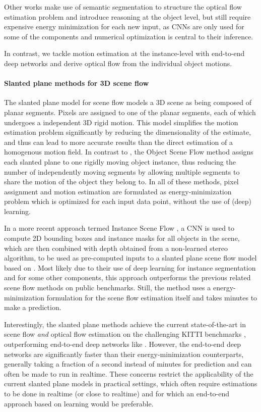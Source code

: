 Other works \cite{ESI, JOF, FlowLayers, MRFlow} make use of semantic segmentation to structure
the optical flow estimation problem and introduce reasoning at the object level,
but still require expensive energy minimization for each
new input, as CNNs are only used for some of the components and numerical
optimization is central to their inference.

In contrast, we tackle motion estimation at the instance-level with end-to-end
deep networks and derive optical flow from the individual object motions.

\paragraph{Slanted plane methods for 3D scene flow}
The slanted plane model for scene flow \cite{PRSF, PRSM} models a 3D scene as being
composed of planar segments. Pixels are assigned to one of the planar segments,
each of which undergoes a independent 3D rigid motion.
This model simplifies the motion estimation problem significantly by reducing the dimensionality
of the estimate, and thus can lead to more accurate results than the direct estimation
of a homogenous motion field.
In contrast to \cite{PRSF, PRSM}, the Object Scene Flow method \cite{KITTI2015}
assigns each slanted plane to one rigidly moving object instance, thus
reducing the number of independently moving segments by allowing multiple
segments to share the motion of the object they belong to.
In all of these methods, pixel assignment and motion estimation are formulated
as energy-minimization problem which is optimized for each input data point,
without the use of (deep) learning.

In a more recent approach termed Instance Scene Flow \cite{InstanceSceneFlow},
a CNN is used to compute 2D bounding boxes and instance masks for all objects in the scene, which are then combined
with depth obtained from a non-learned stereo algorithm, to be used as pre-computed
inputs to a slanted plane scene flow model based on \cite{KITTI2015}.
Most likely due to their use of deep learning for instance segmentation and for some other components, this
approach outperforms the previous related scene flow methods on public benchmarks.
Still, the method uses a energy-minimization formulation for the scene flow estimation itself
and takes minutes to make a prediction.

Interestingly, the slanted plane methods achieve the current state-of-the-art
in scene flow \emph{and} optical flow estimation on the challenging KITTI benchmarks \cite{KITTI2012, KITTI2015},
outperforming end-to-end deep networks like \cite{SceneFlowDataset, FlowNet2}.
However, the end-to-end deep networks are significantly faster than their energy-minimization counterparts,
generally taking a fraction of a second instead of minutes for prediction and can often be made to run in realtime.
These concerns restrict the applicability of the current slanted plane models in practical settings,
which often require estimations to be done in realtime (or close to realtime) and for which an end-to-end
approach based on learning would be preferable.

